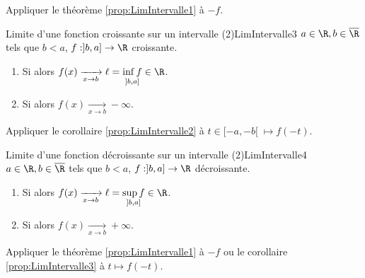 \documentclass[12pt,a4paper]{report}
\begin{document}
\begin{principedemo}{}
Appliquer le théorème \ref{prop:LimIntervalle1} à $-f$.
\end{principedemo}

\begin{corollaire}{Limite d'une fonction croissante sur un intervalle (2)}{LimIntervalle3}
$a \in \R, b \in \overline{\R}$ tels que $b<a$, $f : ]b,a] \to \R$ croissante.
\begin{enumerate}
	\item Si  alors $f(x) \xrightarrow[x \to b]{} \ell = \underset{]b,a]}{\inf f} \in \R$.
	\item Si  alors $f(x) \xrightarrow[x \to b]{} -\infty$.
\end{enumerate}
\end{corollaire}

\begin{principedemo}{}
Appliquer le corollaire \ref{prop:LimIntervalle2} à $t \in [-a,-b[ \; \mapsto f(-t)$.
\end{principedemo}

\begin{corollaire}{Limite d'une fonction décroissante sur un intervalle (2)}{LimIntervalle4}
$a \in \R, b \in \overline{\R}$ tels que $b<a$, $f : ]b,a] \to \R$ décroissante.
\begin{enumerate}
	\item Si  alors $f(x) \xrightarrow[x \to b]{} \ell = \underset{]b,a]}{\sup f} \in \R$.
	\item Si  alors $f(x) \xrightarrow[x \to b]{} +\infty$.
\end{enumerate}
\end{corollaire}

\begin{principedemo}{}
Appliquer le théorème \ref{prop:LimIntervalle1} à $-f$ ou le corollaire \ref{prop:LimIntervalle3} à $t \mapsto f(-t)$.
\end{principedemo}
\end{document}
